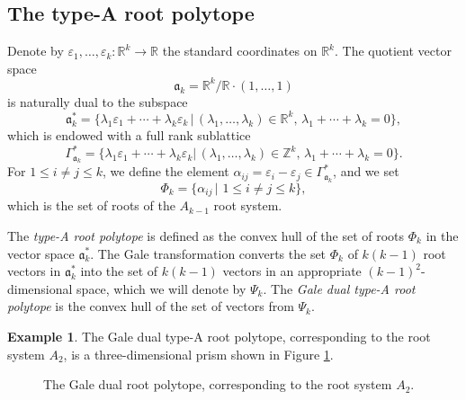 \documentclass[11pt]{article}
\theoremstyle{definition}
\newtheorem{exam}[theo]{Example}
\numberwithin{equation}{section}
\newcommand{\ak}{\mathfrak{a}_k}
\begin{document}
\subsection{The type-A root polytope}\label{S4.1}
Denote by $\varepsilon_1, \ldots ,\varepsilon_k:\mathbb{R}^k\to\mathbb{R}$ 
the 
standard coordinates on  $\mathbb{R}^k$. The quotient vector space
$$\ak=\mathbb{R}^k/\mathbb{R}\cdot(1, \ldots ,1)$$
is naturally dual to the subspace
$$\ak^*=\{\lambda_1\varepsilon_1+\cdots+\lambda_k\varepsilon_k  \, | \,
(\lambda_1, \ldots ,\lambda_k)\in\mathbb{R}^k,\, 
\lambda_1+ \cdots +\lambda_k=0\},$$
which  is endowed with a full rank sublattice
$$\Gamma_{\ak}^* = 
\{\lambda_1\varepsilon_1+\cdots+\lambda_k\varepsilon_k| 
\,(\lambda_1, \ldots ,\lambda_k)\in\mathbb{Z}^k, 
\,\lambda_1+ \cdots +\lambda_k=0\}.$$
For $1\leq i\neq j\leq k$, we define the element $\alpha_{ij} = 
\varepsilon_i-\varepsilon_j \in\Gamma_{\ak}^*$, and we set
$$\Phi_k = \{\alpha_{ij} \, | \,\, 1\leq i\neq j\leq k\},$$ which is the set of 
roots of the $A_{k-1}$ root system. 

The \textit{type-A root polytope} is defined as the convex hull of the set of 
roots $\Phi_k$ in the vector space $\ak^*$. The Gale transformation converts 
the set $\Phi_k$ of $k(k-1)$ root 
vectors in $\ak^*$ into the set of $k(k-1)$ 
vectors in an appropriate $(k-1)^2$-dimensional space, which we will denote by $\Psi_k$. 
The \textit{Gale dual type-A root polytope} is the convex hull of the set of 
vectors from $\Psi_k$.

\begin{exam}\label{ex:prism}
The Gale dual type-A root polytope, corresponding to the root system $A_2$, is a three-dimensional prism shown in Figure \ref{fig1}.
\end{exam}
\begin{figure}[ht]
\centering
{}
\caption{The Gale dual root polytope, corresponding to the root system $A_2$.}\label{fig1}
\end{figure}
\end{document}
